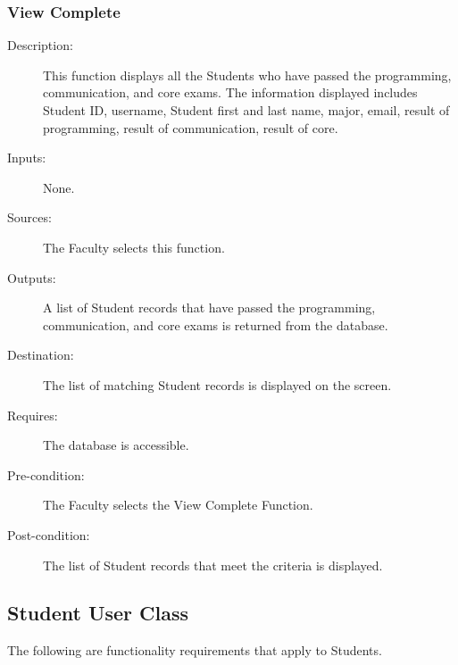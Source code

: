 \subsubsection{\large View Complete}  
\begin{boxed} %
\begin{description}
\item[Description:]
   This function displays all the Students who have passed the programming,
   communication, and core exams. The information displayed includes Student ID,
   username, Student first and last name, major, email, result of programming,
   result of communication, result of core.
\item[Inputs:]
   None.
\item[Sources:]
   The Faculty selects this function.
\item[Outputs:]
   A list of Student records that have passed the programming,
   communication, and core exams is returned from the database.
\item[Destination:]
   The list of matching Student records is displayed on the screen.
\item[Requires:]
   The database is accessible.
\item[Pre-condition:]
   The Faculty selects the View Complete Function.
\item[Post-condition:]
   The list of Student records that meet the criteria is displayed.
\end{description}
\end{boxed}

\subsection{Student User Class}
The following are functionality requirements that apply to Students.
